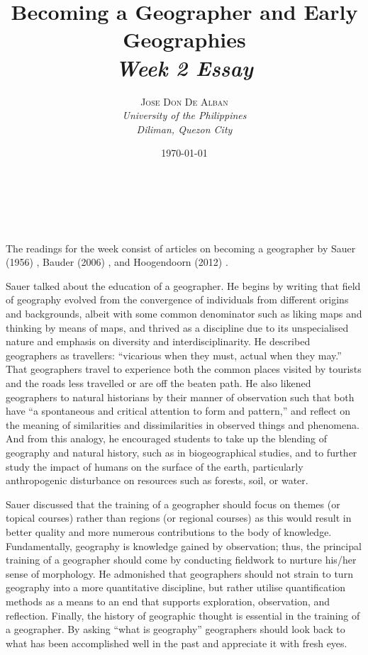 \documentclass[a4paper, 10.5pt]{article} %
\title{\textbf{Becoming a Geographer and Early Geographies}\\ %
\textsl{Week 2 Essay}} %
\author{\textsc{Jose Don De Alban} %
\\{\textit{University of the Philippines} %
\\{\textit{Diliman, Quezon City}}}} %
\date{\today} %
\makeatletter
\renewcommand{\maketitle}
{
\begin{flushright} %
{\LARGE\@title} %
\vspace{40pt} %

{\large\@author} %
\\\@date %

\vspace{10pt} %
\end{flushright}
}
\makeatother
\begin{document}
\maketitle %


\section*{}

The readings for the week consist of articles on becoming a geographer by Sauer (1956) \cite{sauer_1956}, Bauder (2006) \cite{bauder_2006}, and Hoogendoorn (2012) \cite{hoogendoorn_2012}.

Sauer talked about the education of a geographer. He begins by writing that field of geography evolved from the convergence of individuals from different origins and backgrounds, albeit with some common denominator such as liking maps and thinking by means of maps, and thrived as a discipline due to its unspecialised nature and emphasis on diversity and interdisciplinarity. He described geographers as travellers: \enquote{vicarious when they must, actual when they may.} That geographers travel to experience both the common places visited by tourists and the roads less travelled or are off the beaten path. He also likened geographers to natural historians by their manner of observation such that both have \enquote{a spontaneous and critical attention to form and pattern,} and reflect on the meaning of similarities and dissimilarities in observed things and phenomena. And from this analogy, he encouraged students to take up the blending of geography and natural history, such as in biogeographical studies, and to further study the impact of humans on the surface of the earth, particularly anthropogenic disturbance on resources such as forests, soil, or water.

Sauer discussed that the training of a geographer should focus on themes (or topical courses) rather than regions (or regional courses) as this would result in better quality and more numerous contributions to the body of knowledge. Fundamentally, geography is knowledge gained by observation; thus, the principal training of a geographer should come by conducting fieldwork to nurture his/her sense of morphology. He admonished that geographers should not strain to turn geography into a more quantitative discipline, but rather utilise quantification methods as a means to an end that supports exploration, observation, and reflection. Finally, the history of geographic thought is essential in the training of a geographer. By asking \enquote{what is geography} geographers should look back to what has been accomplished well in the past and appreciate it with fresh eyes.
\end{document}
